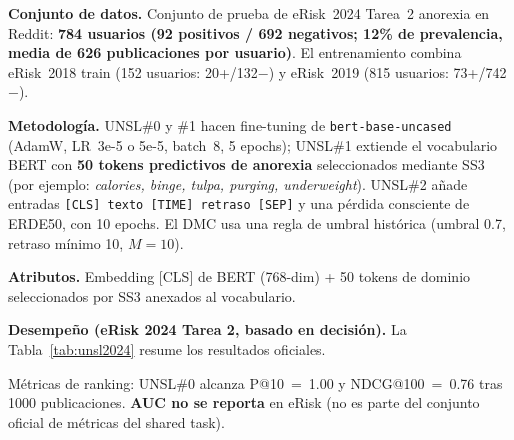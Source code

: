 \documentclass[journal]{IEEEtran}
\begin{document}
\textbf{Conjunto de datos.} Conjunto de prueba de eRisk~2024 Tarea~2 anorexia en Reddit: \textbf{784 usuarios (92 positivos / 692 negativos; 12\% de prevalencia, media de 626 publicaciones por usuario)}. El entrenamiento combina eRisk~2018 train (152 usuarios: 20+/132$-$) y eRisk~2019 (815 usuarios: 73+/742$-$).

\textbf{Metodología.} UNSL\#0 y \#1 hacen fine-tuning de \texttt{bert-base-uncased} (AdamW, LR~3e-5 o 5e-5, batch~8, 5 epochs); UNSL\#1 extiende el vocabulario BERT con \textbf{50 tokens predictivos de anorexia} seleccionados mediante SS3 (por ejemplo: \textit{calories, binge, tulpa, purging, underweight}). UNSL\#2 añade entradas \texttt{[CLS] texto [TIME] retraso [SEP]} y una pérdida consciente de ERDE50, con 10 epochs. El DMC usa una regla de umbral histórica (umbral 0.7, retraso mínimo 10, $M=10$).

\textbf{Atributos.} Embedding [CLS] de BERT (768-dim) + 50 tokens de dominio seleccionados por SS3 anexados al vocabulario.

\textbf{Desempeño (eRisk 2024 Tarea 2, basado en decisión).} La Tabla~\ref{tab:unsl2024} resume los resultados oficiales.

\begin{table}[!htbp]
\centering
\caption{Resultados oficiales eRisk 2024 Tarea 2 (anorexia).}
\label{tab:unsl2024}
\renewcommand{\arraystretch}{1.2}
\setlength{\tabcolsep}{4pt}
\end{table}

Métricas de ranking: UNSL\#0 alcanza P@10~=~1.00 y NDCG@100~=~0.76 tras 1000 publicaciones. \textbf{AUC no se reporta} en eRisk (no es parte del conjunto oficial de métricas del shared task).
\end{document}
